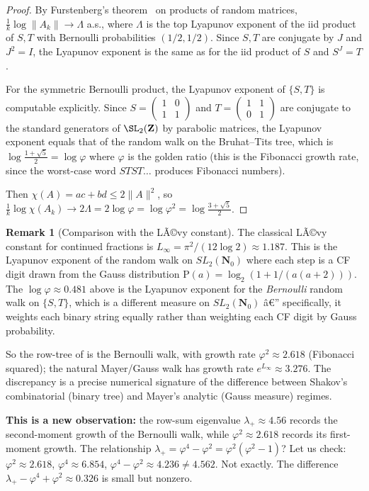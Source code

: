 ﻿\documentclass[11pt]{article}
\theoremstyle{definition}
\newtheorem{remark}[theorem]{Remark}
\newcommand{\Nz}{\mathbf{N}_0}
\newcommand{\Z}{\mathbf{Z}}
\newcommand{\SLNz}{SL_2(\Nz)}
\newcommand{\chiA}{\chi}
\begin{document}
\begin{proof}
By Furstenberg's theorem~\cite{furstenberg-kifer} on products of random matrices, $\frac{1}{k}\log\|A_k\|\to\Lambda$ a.s., where $\Lambda$ is the top Lyapunov exponent of the iid product of $S,T$ with Bernoulli probabilities $(1/2,1/2)$. Since $S,T$ are conjugate by $J$ and $J^2=I$, the Lyapunov exponent is the same as for the iid product of $S$ and $S^J=T$.

For the symmetric Bernoulli product, the Lyapunov exponent of $\{S,T\}$ is computable explicitly. Since $S=\begin{pmatrix}1&0\\1&1\end{pmatrix}$ and $T=\begin{pmatrix}1&1\\0&1\end{pmatrix}$ are conjugate to the standard generators of $\SL_2(\Z)$ by parabolic matrices, the Lyapunov exponent equals that of the random walk on the Bruhat--Tits tree, which is $\log\frac{1+\sqrt{5}}{2}=\log\varphi$ where $\varphi$ is the golden ratio (this is the Fibonacci growth rate, since the worst-case word $STST\ldots$ produces Fibonacci numbers).

Then $\chiA(A)=ac+bd\le 2\|A\|^2$, so $\frac{1}{k}\log\chiA(A_k)\to 2\Lambda=2\log\varphi=\log\varphi^2=\log\frac{3+\sqrt{5}}{2}$.
\end{proof}

\begin{remark}[Comparison with the LÃ©vy constant]
The classical LÃ©vy constant for continued fractions is $L_\infty=\pi^2/(12\log 2)\approx 1.187$. This is the Lyapunov exponent of the random walk on $\SLNz$ where each step is a CF digit drawn from the Gauss distribution $\mathrm{P}(a)=\log_2(1+1/(a(a+2)))$. The $\log\varphi\approx 0.481$ above is the Lyapunov exponent for the \emph{Bernoulli} random walk on $\{S,T\}$, which is a different measure on $\SLNz$ â€” specifically, it weights each binary string equally rather than weighting each CF digit by Gauss probability.

So the row-tree of \cite[\S4]{shakov2024} is the Bernoulli walk, with growth rate $\varphi^2\approx 2.618$ (Fibonacci squared); the natural Mayer/Gauss walk has growth rate $e^{L_\infty}\approx 3.276$. The discrepancy is a precise numerical signature of the difference between Shakov's combinatorial (binary tree) and Mayer's analytic (Gauss measure) regimes.

\textbf{This is a new observation:} the row-sum eigenvalue $\lambda_+\approx 4.56$ records the second-moment growth of the Bernoulli walk, while $\varphi^2\approx 2.618$ records its first-moment growth. The relationship $\lambda_+=\varphi^4-\varphi^2=\varphi^2(\varphi^2-1)$? Let us check: $\varphi^2\approx 2.618$, $\varphi^4\approx 6.854$, $\varphi^4-\varphi^2\approx 4.236\ne 4.562$. Not exactly. The difference $\lambda_+-\varphi^4+\varphi^2\approx 0.326$ is small but nonzero.
\end{remark}
\end{document}

